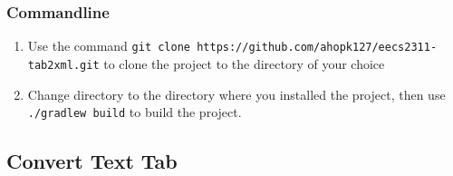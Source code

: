 \documentclass[11pt]{article}
\begin{document}
\subsubsection{Commandline}
\label{sec:org6d027ae}
\begin{enumerate}
\item Use the command \texttt{git clone https://github.com/ahopk127/eecs2311-tab2xml.git} to clone the project to the directory of your choice
\item Change directory to the directory where you installed the project, then use \texttt{./gradlew build} to build the project.
\end{enumerate}
\subsection{Convert Text Tab}
\label{sec:orgf12bb79}
\end{document}
